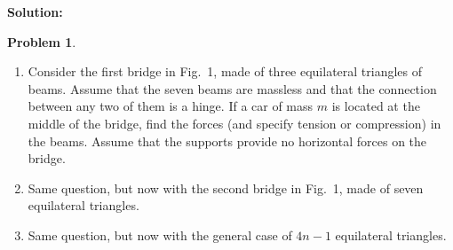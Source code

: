 \documentclass{article}
\theoremstyle{definition}
\newtheorem{problem}{Problem}
\newenvironment{solution}
  {\par\vspace{0.5em}\noindent\textbf{Solution:}\par\nopagebreak\vspace{0.3em}}
  {\par\vspace{1em}}
\begin{document}
\begin{solution}
\begin{minipage}[t]{0.10\textwidth}
\end{minipage}
\end{solution}
\newpage
\begin{problem}
    \noindent
    \begin{minipage}[c]{0.66\textwidth}
        \begin{enumerate}[label=(\alph*), leftmargin=*]
            \item Consider the first bridge in Fig.~1, made of three equilateral triangles of beams. Assume that the seven beams are massless and that the connection between any two of them is a hinge. If a car of mass $m$ is located at the middle of the bridge, find the forces (and specify tension or compression) in the beams. Assume that the supports provide no horizontal forces on the bridge.
            \item Same question, but now with the second bridge in Fig.~1, made of seven equilateral triangles.
            \item Same question, but now with the general case of $4n-1$ equilateral triangles.
        \end{enumerate}
    \end{minipage}%
    \hfill
    \begin{minipage}[c]{0.20\textwidth}
        \centering
        
        \vspace{0.3cm}
        

\end{minipage}
\end{problem}
\end{document}
